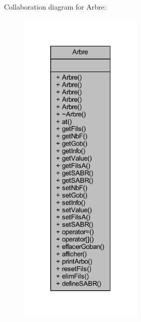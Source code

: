 Collaboration diagram for Arbre\+:
\nopagebreak
\begin{figure}[H]
\begin{center}
\leavevmode
\includegraphics[width=169pt]{class_arbre__coll__graph}
\end{center}
\end{figure}
